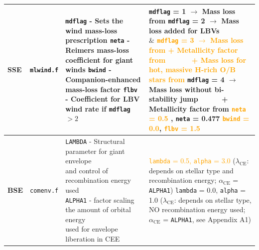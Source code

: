 \begin{landscape}
\begin{table}
\begin{tabular}{|l|l|l|l|}
				\hline \textbf{SSE} & \texttt{mlwind.f} & \makecell[l]{\texttt{mdflag} - Sets the wind mass-loss prescription \\ \texttt{neta} - Reimers mass-loss coefficient for giant winds \\  \texttt{bwind} - Companion-enhanced mass-loss factor \\ \texttt{flbv} - Coefficient for LBV wind rate if \texttt{mdflag}$>2$} & \makecell[l]{\texttt{mdflag} = 1 $\rightarrow$ Mass loss from \cite{Hurley2000} \\ \texttt{mdflag} = 2 $\rightarrow$ Mass loss added for LBVs \cite{HumphreysDavidson1979} \\ $\qquad\qquad$ $\&$ \cite{Belczynskietal2010} \\  \textcolor{orange}{\texttt{mdflag} = 3 $\rightarrow$ Mass loss from} \cite{Belczynskietal2010} \textcolor{orange}{+ Metallicity factor from} \cite{Vinketal2001} \\ $\qquad\quad$ \textcolor{orange}{+ Mass loss for hot, massive H-rich O/B stars from} \cite{Vinketal2001} \\ \texttt{mdflag} = 4 $\rightarrow$ Mass loss without bi-stability jump \cite{Belczynskietal2010} \\ $\qquad\quad$+ Metallicity factor from \cite{Belczynskietal2010} \\ \textcolor{orange}{\texttt{neta} = 0.5} \cite{KudritzkiReimers1978}, \texttt{neta} = 0.477 \cite{McDonaldZijlstra2015} \\ \textcolor{orange}{\texttt{bwind} = 0.0}, \cite{Hurley2002} \quad \textcolor{orange}{\texttt{flbv} = 1.5} \cite{Belczynskietal2010}} \\
				\hline \hline \textbf{BSE} & \texttt{comenv.f} & \makecell[l]{\texttt{LAMBDA} - Structural parameter for giant envelope \\ and control of recombination energy used \\ \texttt{ALPHA1} - factor scaling the amount of orbital energy \\ used for envelope liberation in CEE} & \makecell[l]{ \textcolor{orange}{\texttt{lambda} = 0.5, \texttt{alpha} = 3.0} \cite{GiacobboMapelli2018} ($\lambda_{\mathrm{CE}}$: depends on stellar type \\ and recombination energy; $\alpha_{\mathrm{CE}}$ = \texttt{ALPHA1}) \\ \texttt{lambda} = 0.0, \texttt{alpha} = 1.0 ($\lambda_{\mathrm{CE}}$: depends on stellar type, \\ NO recombination energy used; $\alpha_{\mathrm{CE}}$ = \texttt{ALPHA1}, see Appendix A1)}\\

\end{tabular}
\end{table}
\end{landscape}
